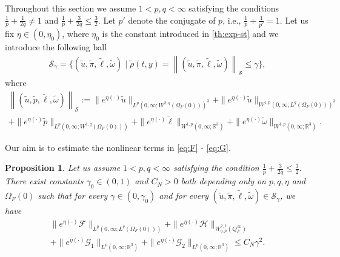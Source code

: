 \documentclass[12pt,a4paper,reqno]{amsart}
\newtheorem{proposition}[theorem]{Proposition}
\theoremstyle{definition}
\theoremstyle{remark}
\numberwithin{equation}{section}
\newcommand{\ofo}{\Omega_{F}(0)}
\newcommand{\rt}{\mathbb{R}^{3}}
\newcommand{\ds}{\displaystyle}
\begin{document}
Throughout this section we assume $1 < p,q < \infty$ satisfying the conditions $\ds \frac{1}{p} + \frac{1}{2q} \neq 1$ and $\ds \frac{1}{p} + \frac{3}{2q} \leqslant \frac{3}{2}.$ Let $p'$
denote the conjugate of $p$, i.e.,
$\ds\frac{1}{p} + \frac{1}{p'} = 1$.  Let us fix  $\eta \in (0, \eta_{0})$, where $\eta_{0}$ is the constant introduced in  \cref{th:exp-st} and  we introduce the following ball
\begin{align*}
{\mathcal S}_{\gamma} = \Big\{(\widetilde u,\widetilde \pi,\widetilde \ell,\widetilde \omega) \mid \widetilde \rho(t,y) =
\left\| (\widetilde u, \widetilde \pi,\widetilde \ell,\widetilde \omega)\right\|_{\mathcal{S}} \leqslant \gamma
 \Big\},
\end{align*}
where
\begin{multline} \label{ball-g}
\left\| (\widetilde u,\widetilde p,\widetilde \ell,\widetilde \omega)\right\|_{\mathcal{S}}:= \|e^{\eta (\cdot)}\widetilde u \|_{L^{p}(0,\infty;W^{2,q}(\ofo))^{3}} + \|e^{\eta (\cdot)}\widetilde u \|_{W^{1,p}(0,\infty;L^{q}(\ofo))^{3}} \\ +
\|e^{\eta (\cdot)}\widetilde p \|_{L^{p}(0,\infty;W^{1,q}(\ofo))}
+ \|e^{\eta (\cdot)}\widetilde \ell \|_{W^{1,p}(0,\infty;\rt)} + \|e^{\eta (\cdot)}\widetilde\omega \|_{W^{1,p}(0,\infty;\rt)}.
\end{multline}







Our aim is to estimate the nonlinear terms  in  \eqref{eq:F} - \eqref{eq:G}.
\begin{proposition} \label{prop-nle}
Let us assume $1 < p,q < \infty$ satisfying the condition  $\ds \frac{1}{p} + \frac{3}{2q} \leqslant \frac{3}{2}.$ There exist constants  $\gamma_{0} \in (0,1)$ and $C_{N} > 0$ both depending only on $p,q,\eta$ and $\Omega_{F}(0)$ such that for every $\gamma \in (0, \gamma_{0})$ and for every  $(\widetilde u,\widetilde \pi,\widetilde \ell,\widetilde \omega)  \in {\mathcal S}_{\gamma}$, we have
\begin{multline} \label{e-nl}
\|e^{\eta (\cdot)}\mathcal{F}\|_{L^{p}(0,\infty;L^{q}(\ofo))} + \|e^{\eta (\cdot)}\mathcal{H}\|_{W^{2,1}_{q,p}(Q_{F}^{\infty})} \\ + \|e^{\eta (\cdot)}\mathcal {G}_{1}\|_{L^{p}(0,\infty;\rt)} + \|e^{\eta (\cdot)}\mathcal {G}_{2}\|_{L^{p}(0,\infty;\rt)} \leqslant  C_{N} \gamma^{2}.
\end{multline}
\end{proposition}
\end{document}
